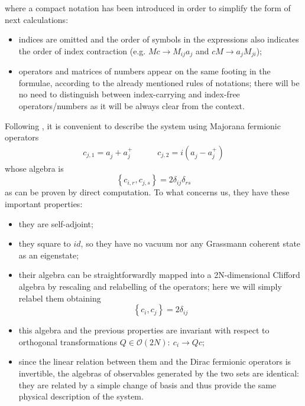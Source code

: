 \documentclass[a4paper,11pt]{article}
\newcommand{\ns}{\vskip 0.8cm}
\begin{document}
   where a compact notation has been introduced in order to simplify the form of next calculations: 
   \begin{itemize}
   \item indices are omitted and the order of symbols in the expressions also indicates the order of index contraction (e.g. $Mc\rightarrow M_{ij}a_j$ and $cM \rightarrow a_j M_{ji}$);
   \item operators and matrices of numbers appear on the same footing in the formulae, according to the already mentioned rules of notations; there will be no need to distinguish between index-carrying and index-free operators/numbers as it will be always clear from the context.
   \end{itemize}
   \ns
   Following \cite{Eisert2010}, it is convenient to describe the system using Majorana fermionic operators
   \begin{align}
    c_{j, 1} = a_j^{ }+a_j^{+} \quad \quad \quad
    c_{j, 2} = i(a_j^{ }-a_j^{+})
    \label{eq:def_majorana}
   \end{align}
    whose algebra is 
   \begin{equation*}
    \left\{c_{i,r},c_{j,s}\right\} = 2\delta_{ij}\delta_{rs}
   \end{equation*}
    as can be proven by direct computation. To what concerns us, they have these important properties:
   \begin{itemize}
   \item they are self-adjoint;
   \item they square to $id$, so they have no vacuum nor any Grassmann coherent state as an eigenstate;
   \item their algebra can be straightforwardly mapped into a 2N-dimensional Clifford algebra by rescaling and relabelling of the operators; here we will simply relabel them obtaining 
   \begin{equation}
    \left\{c_{i},c_{j}\right\} = 2\delta_{ij}
    \label{eq:algebra_majorana}
   \end{equation}
   \item this algebra and the previous properties are invariant with respect to orthogonal transformations $Q\in\mathcal{O}(2N):\ c_i\rightarrow Qc$;
   \item since the linear relation between them and the Dirac fermionic operators is invertible, the algebras of observables generated by the two sets are identical: they are related by a simple change of basis and thus provide the same physical description of the system.
   \end{itemize}
\end{document}
